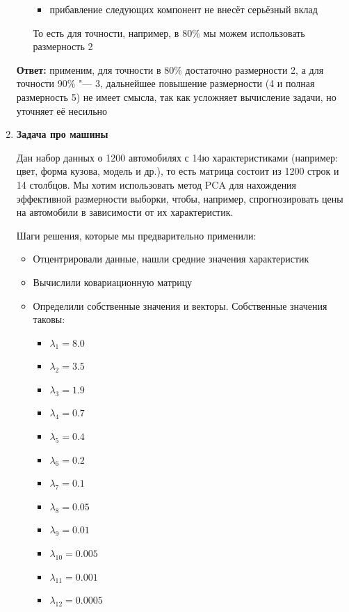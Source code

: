 \begin{enumerate}
\begin{itemize}
\begin{itemize}
            \item прибавление следующих компонент не внесёт серьёзный вклад
        \end{itemize}\par
        То есть для точности, например, в 80\% мы можем использовать размерность 2
    \end{itemize}
    \textbf{Ответ:} применим, для точности в 80\% достаточно размерности 2, а для точности 90\% "--- 3, дальнейшее повышение размерности (4 и полная размерность 5) не имеет смысла, так как усложняет вычисление задачи, но уточняет её несильно
    \item \textbf{Задача про машины} \par
    Дан набор данных о 1200 автомобилях с 14ю характеристиками (например: цвет, форма кузова, модель и др.), то есть матрица состоит из 1200 строк и 14 столбцов. Мы хотим использовать метод PCA для нахождения эффективной размерности выборки, чтобы, например, спрогнозировать цены на автомобили в зависимости от их характеристик. \par
    Шаги решения, которые мы предварительно применили:\par
    \begin{itemize}
        \item Отцентрировали данные, нашли средние значения характеристик
        \item Вычислили ковариационную матрицу
        \item Определили собственные значения и векторы. Собственные значения таковы: \par
        \begin{itemize}
            \item $\lambda_{1}  = 8.0$
            \item $\lambda_{2}  = 3.5$
            \item $\lambda_{3}  = 1.9$
            \item $\lambda_{4}  = 0.7$
            \item $\lambda_{5}  = 0.4$
            \item $\lambda_{6}  = 0.2$
            \item $\lambda_{7}  = 0.1$
            \item $\lambda_{8}  = 0.05$
            \item $\lambda_{9}  = 0.01$
            \item $\lambda_{10} = 0.005$
            \item $\lambda_{11} = 0.001$
            \item $\lambda_{12} = 0.0005$

\end{itemize}
\end{itemize}
\end{enumerate}
